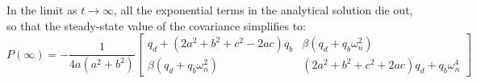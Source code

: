In the limit as $t\rightarrow\infty$, all the exponential terms in the analytical solution die out, so that the steady-state value of the covariance simplifies to:
\begin{equation}
	P(\infty) = -\frac{1}{4a(a^2+b^2)}
	\left[\begin{array}{cc}
		q_d + (2a^2 + b^2 + c^2 - 2ac) q_b & \beta (q_d + q_b \omega_n^2) \\
		\beta (q_d + q_b \omega_n^2) & (2a^2 + b^2 + c^2 + 2ac) q_d
		+ q_b \omega_n^4
	\end{array}\right]
\end{equation} 